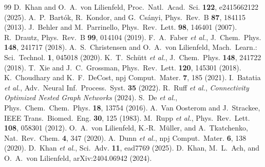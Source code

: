 \documentclass[twocolumn]{article}
\begin{document}
\begin{thebibliography}{99}
 D.~Khan and O.~A.~von Lilienfeld, Proc.~Natl.~Acad.~Sci. \textbf{122}, e2415662122 (2025).
 A.~P.~Bart\'ok, R.~Kondor, and G.~Cs\'anyi, Phys.~Rev.~B \textbf{87}, 184115 (2013).
 J.~Behler and M.~Parrinello, Phys.~Rev.~Lett. \textbf{98}, 146401 (2007).
 R.~Drautz, Phys.~Rev.~B \textbf{99}, 014104 (2019).
 F.~A.~Faber \textit{et al.}, J.~Chem.~Phys. \textbf{148}, 241717 (2018).
 A.~S.~Christensen and O.~A.~von Lilienfeld, Mach.~Learn.: Sci.~Technol. \textbf{1}, 045018 (2020).
 K.~T.~Sch\"utt \textit{et al.}, J.~Chem.~Phys. \textbf{148}, 241722 (2018).
 T.~Xie and J.~C.~Grossman, Phys.~Rev.~Lett. \textbf{120}, 145301 (2018).
 K.~Choudhary and K.~F.~DeCost, npj Comput.~Mater. \textbf{7}, 185 (2021).
 I.~Batatia \textit{et al.}, Adv.~Neural Inf.~Process.~Syst. \textbf{35} (2022).
 R.~Ruff \textit{et al.}, \textit{Connectivity Optimized Nested Graph Networks} (2024).
 S.~De \textit{et al.}, Phys.~Chem.~Chem.~Phys. \textbf{18}, 13754 (2016).
 A.~Van Oosterom and J.~Strackee, IEEE Trans.~Biomed.~Eng. \textbf{30}, 125 (1983).
 M.~Rupp \textit{et al.}, Phys.~Rev.~Lett. \textbf{108}, 058301 (2012).
 O.~A.~von Lilienfeld, K.-R.~M\"uller, and A.~Tkatchenko, Nat.~Rev.~Chem. \textbf{4}, 347 (2020).
 A.~Dunn \textit{et al.}, npj Comput.~Mater. \textbf{6}, 138 (2020).
 D.~Khan \textit{et al.}, Sci.~Adv. \textbf{11}, ead7769 (2025).
 D.~Khan, M.~L.~Ach, and O.~A.~von Lilienfeld, arXiv:2404.06942 (2024).
\end{thebibliography}
\end{document}
